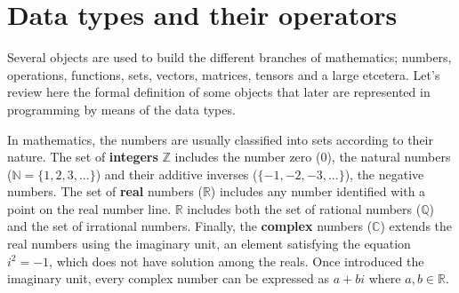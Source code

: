 





    \section{Data types and their operators}
    
Several objects are used to build the different branches of mathematics; numbers, operations, functions, sets, vectors, matrices, tensors and a large etcetera. 
Let's review here the formal definition of some objects that later are represented in programming by means of the data types. 

In mathematics, the numbers are usually classified into sets according to their nature.
The set of \textbf{integers} $\mathbb{Z}$ includes the number zero (0), the natural numbers ($\mathbb{N} = \{ 1,2,3,... \}$) and their additive inverses ($\{ -1,-2,-3,... \}$), the negative numbers.
The set of \textbf{real} numbers ($\mathbb{R}$) includes any number identified with a point on the real number line.
$\mathbb{R}$ includes both the set of rational numbers ($\mathbb{Q}$) and the set of irrational numbers.
Finally, the \textbf{complex} numbers ($\mathbb{C}$) extends the real numbers using the imaginary unit, an element satisfying the equation $i^2 = -1$, which does not have solution among the reals.
Once introduced the imaginary unit, every complex number can be expressed as $a+bi$ where $a,b\in\mathbb{R}$. 

